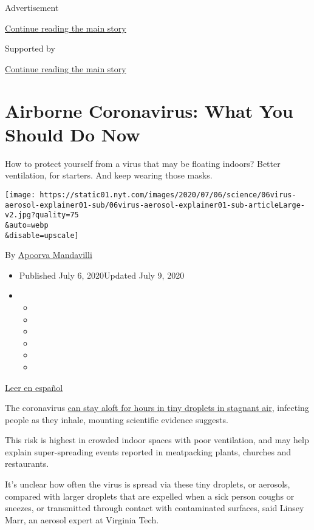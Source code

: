 Advertisement

\protect\hyperlink{after-top}{Continue reading the main story}

Supported by

\protect\hyperlink{after-sponsor}{Continue reading the main story}

\hypertarget{airborne-coronavirus-what-you-should-do-now}{%
\section{Airborne Coronavirus: What You Should Do
Now}\label{airborne-coronavirus-what-you-should-do-now}}

How to protect yourself from a virus that may be floating indoors?
Better ventilation, for starters. And keep wearing those masks.

\texttt{[image: https://static01.nyt.com/images/2020/07/06/science/06virus-aerosol-explainer01-sub/06virus-aerosol-explainer01-sub-articleLarge-v2.jpg?quality=75\\\&auto=webp\\\&disable=upscale]}

By \href{https://www.nytimes.com/by/apoorva-mandavilli}{Apoorva
Mandavilli}

\begin{itemize}
\item
  Published July 6, 2020Updated July 9, 2020
\item
  \begin{itemize}
  \item
  \item
  \item
  \item
  \item
  \item
  \end{itemize}
\end{itemize}

\href{https://www.nytimes.com/es/2020/07/08/espanol/ciencia-y-tecnologia/coronavirus-aire-aerosoles.html}{Leer
en español}

The coronavirus
\href{https://www.nytimes.com/2020/07/04/health/239-experts-with-one-big-claim-the-coronavirus-is-airborne.html}{can
stay aloft for hours in tiny droplets in stagnant air}, infecting people
as they inhale, mounting scientific evidence suggests.

This risk is highest in crowded indoor spaces with poor ventilation, and
may help explain super-spreading events reported in meatpacking plants,
churches and restaurants.

It's unclear how often the virus is spread via these tiny droplets, or
aerosols, compared with larger droplets that are expelled when a sick
person coughs or sneezes, or transmitted through contact with
contaminated surfaces, said Linsey Marr, an aerosol expert at Virginia
Tech.

